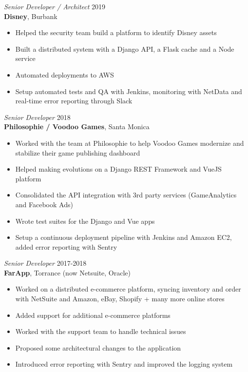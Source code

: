 \documentclass[line,resmargin]{res}
\begin{document}
\begin{resume}
{\sl Senior Developer / Architect\/} \hfill 2019\\
{\bf Disney}, Burbank
\begin{itemize} \itemsep -2pt
\item Helped the security team build a platform to identify Disney assets
\item Built a distributed system with a Django API, a Flask cache and a Node service
\item Automated deployments to AWS
\item Setup automated tests and QA with Jenkins, monitoring with NetData and real-time error reporting through Slack
\end{itemize}

{\sl Senior Developer\/} \hfill 2018\\
{\bf Philosophie / Voodoo Games}, Santa Monica
\begin{itemize} \itemsep -2pt
\item Worked with the team at Philosophie to help Voodoo Games modernize and stabilize their game publishing dashboard
\item Helped making evolutions on a Django REST Framework and VueJS platform
\item Consolidated the API integration with 3rd party services (GameAnalytics and Facebook Ads)
\item Wrote test suites for the Django and Vue apps
\item Setup a continuous deployment pipeline with Jenkins and Amazon EC2, added error reporting with Sentry
\end{itemize}

{\sl Senior Developer\/} \hfill 2017-2018\\
{\bf FarApp}, Torrance (now Netsuite, Oracle)
\begin{itemize} \itemsep -2pt
\item Worked on a distributed e-commerce platform, syncing inventory and order with NetSuite and Amazon, eBay, Shopify + many more online stores
\item Added support for additional e-commerce platforms
\item Worked with the support team to handle technical issues
\item Proposed some architectural changes to the application
\item Introduced error reporting with Sentry and improved the logging system
\end{itemize}


\end{resume}
\end{document}
